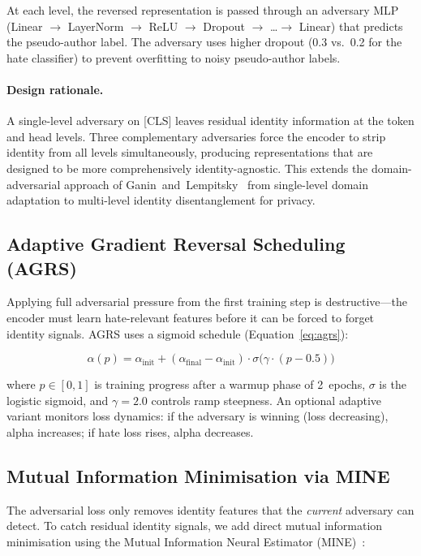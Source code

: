 \documentclass{article}
\begin{document}
At each level, the reversed representation is passed through an
adversary MLP (Linear $\to$ LayerNorm $\to$ ReLU $\to$ Dropout
$\to$ \dots $\to$ Linear) that predicts the pseudo-author label.
The adversary uses higher dropout (0.3 vs.\ 0.2 for the hate
classifier) to prevent overfitting to noisy pseudo-author labels.

\paragraph{Design rationale.}
A single-level adversary on [CLS] leaves residual identity information
at the token and head levels. Three complementary adversaries force the
encoder to strip identity from all levels simultaneously, producing
representations that are designed to be more comprehensively
identity-agnostic.
This extends the domain-adversarial approach of
Ganin~and~Lempitsky~\cite{ganin2015unsupervised} from single-level
domain adaptation to multi-level identity disentanglement for privacy.

\subsection{Adaptive Gradient Reversal Scheduling (AGRS)}

Applying full adversarial pressure from the first training step is
destructive---the encoder must learn hate-relevant features before it
can be forced to forget identity signals. AGRS uses a sigmoid schedule
(Equation~\ref{eq:agrs}):

\begin{equation}
\label{eq:agrs}
\alpha(p) = \alpha_{\text{init}} + (\alpha_{\text{final}} - \alpha_{\text{init}})
\cdot \sigma\big(\gamma \cdot (p - 0.5)\big)
\end{equation}

\noindent
where $p \in [0,1]$ is training progress after a warmup phase of 2~epochs,
$\sigma$ is the logistic sigmoid, and $\gamma=2.0$ controls ramp steepness.
An optional adaptive variant monitors loss dynamics: if the adversary is
winning (loss decreasing), alpha increases; if hate loss rises,
alpha decreases.

\subsection{Mutual Information Minimisation via MINE}

The adversarial loss only removes identity features that the
\emph{current} adversary can detect. To catch residual identity signals,
we add direct mutual information minimisation using the Mutual
Information Neural Estimator (MINE)~\cite{belghazi2018mine}:
\end{document}
